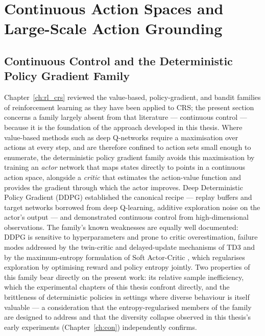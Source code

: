 \section{Continuous Action Spaces and Large-Scale Action Grounding}
\label{sec:continuous}

\subsection{Continuous Control and the Deterministic Policy Gradient Family}

Chapter~\ref{ch:rl_crs} reviewed the value-based, policy-gradient, and bandit families of reinforcement learning as they have been applied to CRS; the present section concerns a family largely absent from that literature — continuous control — because it is the foundation of the approach developed in this thesis. Where value-based methods such as deep Q-networks \citep{mnih2015human} require a maximisation over actions at every step, and are therefore confined to action sets small enough to enumerate, the deterministic policy gradient family avoids this maximisation by training an \textit{actor} network that maps states directly to points in a continuous action space, alongside a \textit{critic} that estimates the action-value function and provides the gradient through which the actor improves. Deep Deterministic Policy Gradient (DDPG) \citep{lillicrap2015continuous} established the canonical recipe — replay buffers and target networks borrowed from deep Q-learning, additive exploration noise on the actor's output — and demonstrated continuous control from high-dimensional observations. The family's known weaknesses are equally well documented: DDPG is sensitive to hyperparameters and prone to critic overestimation, failure modes addressed by the twin-critic and delayed-update mechanisms of TD3 \citep{fujimoto2018addressing} and by the maximum-entropy formulation of Soft Actor-Critic \citep{haarnoja2018soft}, which regularises exploration by optimising reward and policy entropy jointly. Two properties of this family bear directly on the present work: its relative sample inefficiency, which the experimental chapters of this thesis confront directly, and the brittleness of deterministic policies in settings where diverse behaviour is itself valuable — a consideration that the entropy-regularised members of the family are designed to address and that the diversity collapse observed in this thesis's early experiments (Chapter~\ref{ch:con}) independently confirms.

